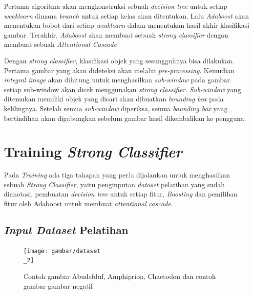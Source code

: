Pertama algoritma akan mengkonstruksi sebuah \emph{decision tree} untuk setiap 
\emph{weaklearn} dimana \emph{branch} untuk setiap kelas akan ditentukan. Lalu 
\emph{Adaboost} akan menentukan bobot dari setiap \emph{weaklearn} dalam menentukan hasil akhir 
klasifikasi gambar. Terakhir, \emph{Adaboost} akan membuat sebuah 
\emph{strong classifier} dengan membuat sebuah \emph{Attentional Cascade}

Dengan \emph{strong classifier}, klasifikasi objek yang sesungguhnya bisa dilakukan. 
Pertama gambar yang akan dideteksi akan melalui \emph{pre-processing}. 
Kemudian \emph{integral image} akan dihitung untuk 
menghasilkan \emph{sub-window} pada gambar. setiap sub-window akan dicek menggunakan 
\emph{strong classifier}. \emph{Sub-window} yang ditemukan memiliki objek yang 
dicari akan dibuatkan \emph{bounding box} pada kelilingnya. Setelah semua 
\emph{sub-window} diperiksa, semua \emph{bounding box} yang bertindihan akan 
digabungkan sebelum gambar hasil dikembalikan ke pengguna.

\section{Training \emph{Strong Classifier}}

Pada \textit{Training} ada tiga tahapan yang perlu dijalankan 
untuk menghasilkan sebuah \emph{Strong Classifier}, 
yaitu penginputan \textit{dataset} pelatihan yang sudah dianotasi, 
pembuatan \emph{decision tree} untuk setiap fitur, 
\emph{Boosting }dan pemilihan fitur oleh Adaboost untuk membuat \emph{attentional cascade}.

\subsection{\textit{Input Dataset} Pelatihan}

\begin{figure}[H]
  \centering{}
	\texttt{[image: gambar/dataset\\\_2]}
  \caption{Contoh gambar Abudefduf, Amphiprion, Chaetodon dan contoh gambar-gambar negatif}
\end{figure}

